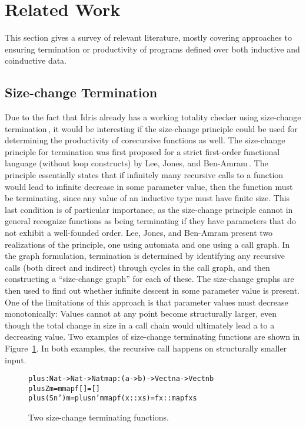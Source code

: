 \section{Related Work}
\label{sec:related_work}
This section gives a survey of relevant literature, mostly covering approaches to ensuring termination or productivity of programs defined over both inductive and coinductive data.

\subsection{Size-change Termination}
Due to the fact that Idris already has a working totality checker using size-change termination\,\citep{BradyIdrisImpl13}, it would be interesting if the size-change principle could be used for determining the productivity of corecursive functions as well. The size-change principle for termination was first proposed for a strict first-order functional language (without loop constructs) by Lee, Jones, and Ben-Amram\,\citep{LeeJones01SizeChange}. The principle essentially states that if infinitely many recursive calls to a function would lead to infinite decrease in some parameter value, then the function must be terminating, since any value of an inductive type must have finite size. This last condition is of particular importance, as the size-change principle cannot in general recognize functions as being terminating if they have parameters that do not exhibit a well-founded order. Lee, Jones, and Ben-Amram present two realizations of the principle, one using automata and one using a call graph. In the graph formulation, termination is determined by identifying any recursive calls (both direct and indirect) through cycles in the call graph, and then constructing a ``size-change graph'' for each of these. The size-change graphs are then used to find out whether infinite descent in some parameter value is present. One of the limitations of this approach is that parameter values must decrease monotonically: Values cannot at any point become structurally larger, even though the total change in size in a call chain would ultimately lead a to a decreasing value. Two examples of size-change terminating functions are shown in Figure~\ref{fig:sizechange_plus_map}. In both examples, the recursive call happens on structurally smaller input.

\begin{figure}
\begin{alltt}
plus : Nat -> Nat -> Nat           map : (a -> b) -> Vect n a -> Vect n b 
plus Z      m = m                  map f []        = []
plus (S n') m = plus n' m          map f (x :: xs) = f x :: map f xs 
\end{alltt}
\caption{Two size-change terminating functions.}
\label{fig:sizechange_plus_map}
\end{figure}

